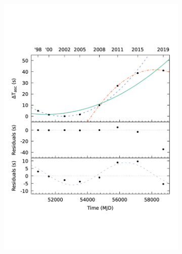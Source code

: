\documentclass[graybox]{svmult}
\begin{document}
\begin{figure}
\begin{subfigure}{.5\textwidth}
  \centering
  \includegraphics[width=.8\linewidth]{REVIEW_AMXP/1808_orb_2}
  \label{fig:sfig1}
\end{subfigure}%
\begin{subfigure}{.5\textwidth}
  \centering

\end{subfigure}
\end{figure}
\end{document}
